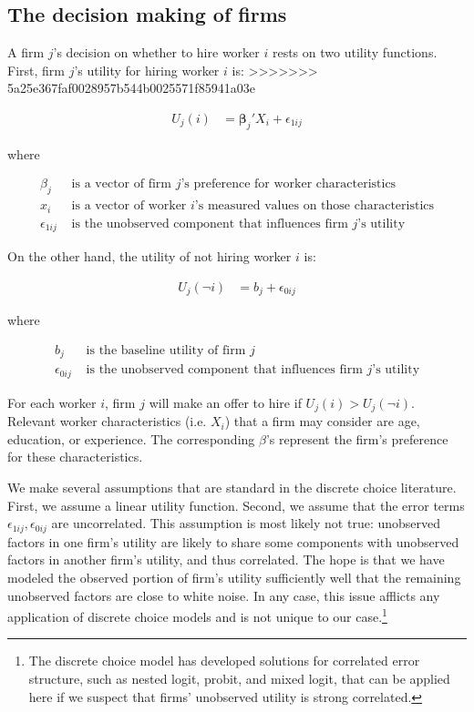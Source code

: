 \subsection{The decision making of firms}

A firm $j$'s decision on whether to hire worker $i$ rests on two utility
functions. First, firm $j$'s utility for hiring worker $i$ is:
>>>>>>> 5a25e367faf0028957b544b0025571f85941a03e

\begin{align}
U_j(i) &= \bm{\beta}_j' X_i + \epsilon_{1ij}
\end{align}

where

\begin{align*}
\beta_j &\text{ is a vector of firm $j$'s preference for worker characteristics} \\
x_i &\text{ is a vector of worker $i$'s measured values on those characteristics} \\
\epsilon_{1ij} &\text{ is the unobserved component that influences firm $j$'s utility}
\end{align*}

On the other hand, the utility of not hiring worker $i$ is:

\begin{align}
U_j(\neg i) &= b_j + \epsilon_{0ij}
\end{align}

where

\begin{align*}
b_j &\text{ is the baseline utility of firm $j$} \\
\epsilon_{0ij} &\text{ is the unobserved component that influences firm $j$'s utility}
\end{align*}

For each worker $i$, firm $j$ will make an offer to hire if $U_j(i) > U_j(\neg
i)$. Relevant worker characteristics (i.e. $X_i$) that a firm may consider are
age, education, or experience. The corresponding $\beta$'s represent the firm's
preference for these characteristics.

We make several assumptions that are standard in the discrete choice literature.
First, we assume a linear utility function. Second, we assume that the error
terms $\epsilon_{1ij}, \epsilon_{0ij}$ are uncorrelated. This assumption is most
likely not true: unobserved factors in one firm's utility are likely to share
some components with unobserved factors in another firm's utility, and thus
correlated. The hope is that we have modeled the observed portion of firm's
utility sufficiently well that the remaining unobserved factors are close to
white noise. In any case, this issue afflicts any application of discrete choice
models and is not unique to our case.\footnote{The discrete choice model has
  developed solutions for correlated error structure, such as nested logit,
  probit, and mixed logit, that can be applied here if we suspect that firms'
  unobserved utility is strong correlated.} 


